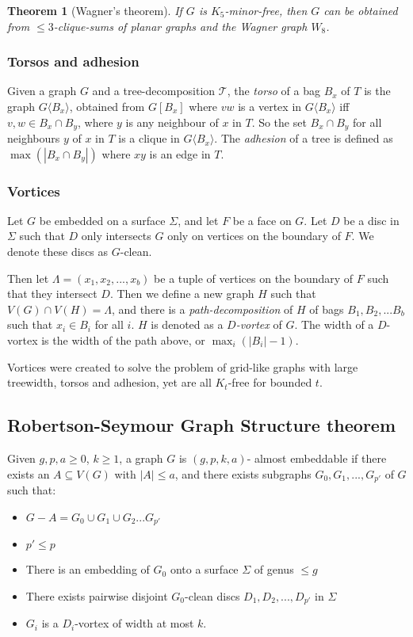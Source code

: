 \documentclass[]{article}
\newcommand{\tree}{\mathcal{T}}
\newtheorem{theorem}{Theorem}
\theoremstyle{definition}
\numberwithin{theorem}{section}
\numberwithin{equation}{section}
\begin{document}
\begin{theorem}[Wagner's theorem\cite{wagnerUeberEigenschaftEbenen1937}]\label{thm:WagnersTheorem}
	If $G$ is $K_5$-minor-free, then $G$ can be obtained from $\leq 3$-clique-sums of planar graphs and the Wagner graph $W_8$.
\end{theorem}


\subsubsection{Torsos and adhesion}\label{sssec:Torsos and Adhesion}
Given a graph $G$ and a tree-decomposition $\tree$, the \textit{torso} of a bag $B_x$ of $T$ is the graph $G\langle B_x \rangle$, obtained from $G[B_x]$ where $vw$ is a vertex in $G\langle B_x \rangle$ iff $v,w \in B_x \cap B_y$, where $y$ is any neighbour of $x$ in $T$. So the set $B_x \cap B_y$ for all neighbours $y$ of $x$ in $T$ is a clique in $G\langle B_x \rangle$. 
The \textit{adhesion} of a tree is defined as $\max(|B_x \cap B_y|)$ where $xy$ is an edge in $T$.

\subsubsection{Vortices}\label{sssec:vortices}
Let $G$ be embedded on a surface $\Sigma$, and let $F$ be a face on $G$. Let $D$ be a disc in $\Sigma$ such that $D$ only intersects $G$ only on vertices on the boundary of $F$. We denote these discs as $G$-clean. 

Then let $\Lambda = (x_1, x_2, ..., x_b)$ be a tuple of vertices on the boundary of $F$ such that they intersect $D$. Then we define a new graph $H$ such that $V(G) \cap V(H) = \Lambda$, and there is a \textit{path-decomposition} of $H$ of bags $B_1, B_2, ... B_b$ such that $x_i \in B_i$ for all $i$. $H$ is denoted as a \textit{$D$-vortex} of $G$. The width of a $D$-vortex is the width of the path above, or $\max_i(|B_i| - 1)$. 

Vortices were created to solve the problem of grid-like graphs with large treewidth, torsos and adhesion, yet are all $K_t$-free for bounded $t$. 
\subsection{Robertson-Seymour Graph Structure theorem\cite{robertsonGraphMinorsXVI2003}}\label{ssec:Robertson_Seymour_Graph_Structure}
Given $g, p, a \geq 0$, $k \geq 1$, a graph $G$ is $(g, p, k, a)$- almost embeddable if there exists an $A \subseteq V(G)$ with $|A| \leq a$, and there exists subgraphs $G_0, G_1, ...,  G_{p'}$ of $G$ such that:
\begin{itemize}
	\item $G - A = G_0 \cup G_1 \cup G_2 ... G_{p'}$
	\item $p' \leq p$
	\item There is an embedding of $G_0$ onto a surface $\Sigma$ of genus $\leq g$
	\item There exists pairwise disjoint $G_0$-clean discs $D_1, D_2, ..., D_{p'}$ in $\Sigma$
	\item $G_i$ is a $D_i$-vortex of width at most $k$.
\end{itemize}
\end{document}
